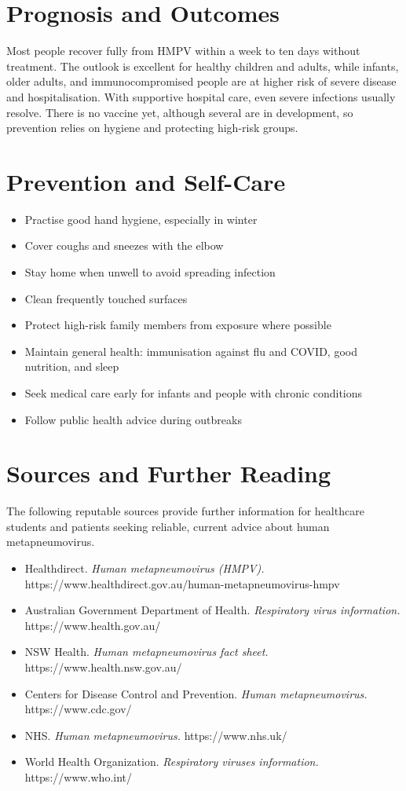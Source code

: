 \section*{Prognosis and Outcomes}
Most people recover fully from HMPV within a week to ten days without treatment. The outlook is excellent for healthy children and adults, while infants, older adults, and immunocompromised people are at higher risk of severe disease and hospitalisation. With supportive hospital care, even severe infections usually resolve. There is no vaccine yet, although several are in development, so prevention relies on hygiene and protecting high-risk groups.

\section*{Prevention and Self-Care}
\begin{itemize}
    \item Practise good hand hygiene, especially in winter
    \item Cover coughs and sneezes with the elbow
    \item Stay home when unwell to avoid spreading infection
    \item Clean frequently touched surfaces
    \item Protect high-risk family members from exposure where possible
    \item Maintain general health: immunisation against flu and COVID, good nutrition, and sleep
    \item Seek medical care early for infants and people with chronic conditions
    \item Follow public health advice during outbreaks
\end{itemize}

\section*{Sources and Further Reading}
The following reputable sources provide further information for healthcare students and patients seeking reliable, current advice about human metapneumovirus.

\begin{itemize}
    \item Healthdirect. \textit{Human metapneumovirus (HMPV).} https://www.healthdirect.gov.au/human-metapneumovirus-hmpv
    \item Australian Government Department of Health. \textit{Respiratory virus information.} https://www.health.gov.au/
    \item NSW Health. \textit{Human metapneumovirus fact sheet.} https://www.health.nsw.gov.au/
    \item Centers for Disease Control and Prevention. \textit{Human metapneumovirus.} https://www.cdc.gov/
    \item NHS. \textit{Human metapneumovirus.} https://www.nhs.uk/
    \item World Health Organization. \textit{Respiratory viruses information.} https://www.who.int/
\end{itemize}
